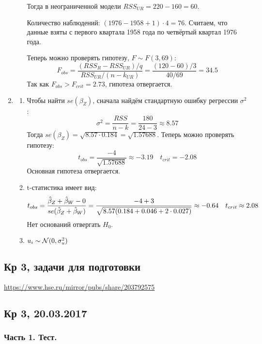 \documentclass[12pt, a4paper]{article}
\begin{document}
\begin{enumerate}
\begin{enumerate}
Тогда в неограниченной модели $RSS_{UR} = 220 - 160 = 60$.

Количество наблюдений: $(1976-1958+1)\cdot 4 = 76$. Считаем, что данные взяты с первого квартала 1958 года по четвёртый квартал 1976 года.

Теперь можно проверять гипотезу, $F \sim F(3, 69)$:
\[
F_{obs} = \frac{(RSS_{R} - RSS_{UR}) / q}{RSS_{UR}/(n-k_{UR})} = \frac{(120 - 60) / 3}{40/69} = 34.5
\]
Так как $F_{obs} > F_{crit} = 2.73$, гипотеза отвергается.
\end{enumerate}

\item
\begin{enumerate}
\item Чтобы найти $se(\beta_Z)$, сначала найдём стандартную ошибку регрессии $\sigma^2$:
\[
\sigma^2 = \frac{RSS}{n-k} = \frac{180}{24-3} \approx 8.57
\]
Тогда $se(\beta_Z) = \sqrt{8.57 \cdot 0.184} = \sqrt{1.57688}$. Теперь можно проверять гипотезу:
\[
t_{obs} = \frac{-4}{\sqrt{1.57688}} \approx -3.19 \quad t_{crit} = -2.08
\]
Основная гипотеза отвергается.
\item t-статистика имеет вид:
\[
t_{obs} = \frac{\hat{\beta}_Z + \hat{\beta}_W - 0}{se(\hat{\beta}_Z + \hat{\beta}_W)} = \frac{-4 + 3}{\sqrt{8.57(0.184 + 0.046 + 2 \cdot 0.027)}} \approx -0.64 \quad t_{crit} \approx 2.08
\]
Нет оснований отвергать $H_0$.
\item $u_i \sim \mathcal{N}(0, \sigma_u^2)$
\end{enumerate}
\end{enumerate}


\subsection{Кр 3, задачи для подготовки}

\url{https://www.hse.ru/mirror/pubs/share/203792575}

\subsection{Кр 3, 20.03.2017}


\subsubsection*{Часть 1. Тест.}




\end{document}
